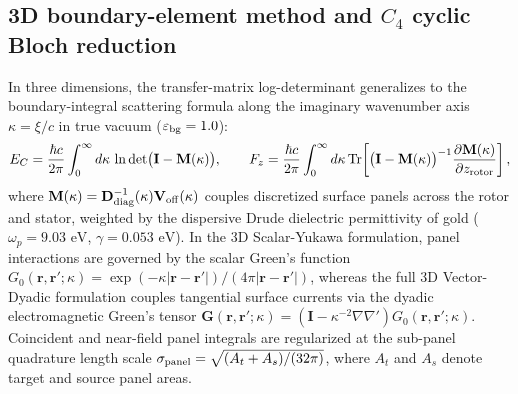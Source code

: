 \documentclass[pdflatex,sn-nature]{sn-jnl}
\begin{document}
\subsection*{3D boundary-element method and $C_4$ cyclic Bloch reduction}
In three dimensions, the transfer-matrix log-determinant generalizes to the boundary-integral scattering formula along the imaginary wavenumber axis $\kappa = \xi/c$ in true vacuum ($\varepsilon_{\rm bg}=1.0$):
\begin{equation}
E_C = \frac{\hbar c}{2\pi} \int_0^\infty d\kappa \, \ln\det\bigl(\mathbf{I} - \mathbf{M}(\kappa)\bigr),
\qquad
F_z = \frac{\hbar c}{2\pi} \int_0^\infty d\kappa \, \mathrm{Tr}\!\left[\bigl(\mathbf{I} - \mathbf{M}(\kappa)\bigr)^{-1} \frac{\partial \mathbf{M}(\kappa)}{\partial z_{\rm rotor}}\right],
\label{eq:methods_bem}
\end{equation}
where $\mathbf{M}(\kappa) = \mathbf{D}_{\rm diag}^{-1}(\kappa)\mathbf{V}_{\rm off}(\kappa)$ couples discretized surface panels across the rotor and stator, weighted by the dispersive Drude dielectric permittivity of gold ($\omega_p = 9.03\text{ eV}$, $\gamma = 0.053\text{ eV}$). In the 3D Scalar-Yukawa formulation, panel interactions are governed by the scalar Green's function $G_0(\mathbf{r},\mathbf{r}';\kappa) = \exp(-\kappa |\mathbf{r}-\mathbf{r}'|)/(4\pi |\mathbf{r}-\mathbf{r}'|)$, whereas the full 3D Vector-Dyadic formulation couples tangential surface currents via the dyadic electromagnetic Green's tensor $\mathbf{G}(\mathbf{r},\mathbf{r}';\kappa) = (\mathbf{I} - \kappa^{-2}\nabla\nabla')G_0(\mathbf{r},\mathbf{r}';\kappa)$. Coincident and near-field panel integrals are regularized at the sub-panel quadrature length scale $\sigma_{\rm panel} = \sqrt{(A_t+A_s)/(32\pi)}$, where $A_t$ and $A_s$ denote target and source panel areas.
\end{document}
